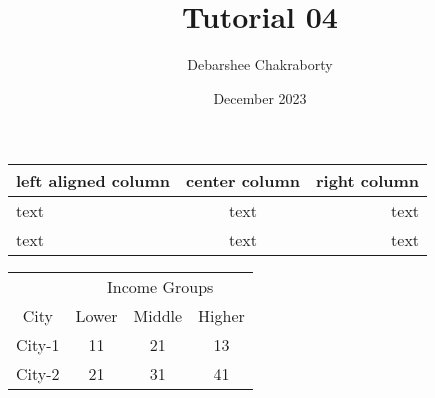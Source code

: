 \documentclass{article}
\title{Tutorial 04}
\author{Debarshee Chakraborty}
\date{December 2023}
\begin{document}
\maketitle

\begin{tabular}{|lcr|}
    left aligned column & center column & right column \\
    \hline
    text & text & text \\
    text & text & text \\
\end{tabular}

\begin{center}
    \begin{tabular}{|c|c|c|c|}
    \hline
    &\multicolumn{3}{|c|}{Income Groups} \\
    \cline{2-4}
    City & Lower & Middle & Higher \\
    \hline
    City-1 & 11 & 21 & 13 \\
    City-2 & 21 & 31 & 41 \\
    \hline
    \end{tabular}
\end{center}
\end{document}

